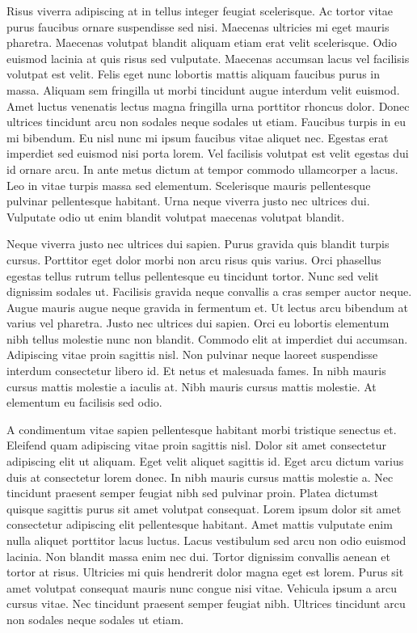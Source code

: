 \documentclass[11pt,a4paper]{article}
\begin{document}
Risus viverra adipiscing at in tellus integer feugiat scelerisque. Ac tortor vitae purus faucibus ornare suspendisse sed nisi. Maecenas ultricies mi eget mauris pharetra. Maecenas volutpat blandit aliquam etiam erat velit scelerisque. Odio euismod lacinia at quis risus sed vulputate. Maecenas accumsan lacus vel facilisis volutpat est velit. Felis eget nunc lobortis mattis aliquam faucibus purus in massa. Aliquam sem fringilla ut morbi tincidunt augue interdum velit euismod. Amet luctus venenatis lectus magna fringilla urna porttitor rhoncus dolor. Donec ultrices tincidunt arcu non sodales neque sodales ut etiam. Faucibus turpis in eu mi bibendum. Eu nisl nunc mi ipsum faucibus vitae aliquet nec. Egestas erat imperdiet sed euismod nisi porta lorem. Vel facilisis volutpat est velit egestas dui id ornare arcu. In ante metus dictum at tempor commodo ullamcorper a lacus. Leo in vitae turpis massa sed elementum. Scelerisque mauris pellentesque pulvinar pellentesque habitant. Urna neque viverra justo nec ultrices dui. Vulputate odio ut enim blandit volutpat maecenas volutpat blandit.

Neque viverra justo nec ultrices dui sapien. Purus gravida quis blandit turpis cursus. Porttitor eget dolor morbi non arcu risus quis varius. Orci phasellus egestas tellus rutrum tellus pellentesque eu tincidunt tortor. Nunc sed velit dignissim sodales ut. Facilisis gravida neque convallis a cras semper auctor neque. Augue mauris augue neque gravida in fermentum et. Ut lectus arcu bibendum at varius vel pharetra. Justo nec ultrices dui sapien. Orci eu lobortis elementum nibh tellus molestie nunc non blandit. Commodo elit at imperdiet dui accumsan. Adipiscing vitae proin sagittis nisl. Non pulvinar neque laoreet suspendisse interdum consectetur libero id. Et netus et malesuada fames. In nibh mauris cursus mattis molestie a iaculis at. Nibh mauris cursus mattis molestie. At elementum eu facilisis sed odio.

A condimentum vitae sapien pellentesque habitant morbi tristique senectus et. Eleifend quam adipiscing vitae proin sagittis nisl. Dolor sit amet consectetur adipiscing elit ut aliquam. Eget velit aliquet sagittis id. Eget arcu dictum varius duis at consectetur lorem donec. In nibh mauris cursus mattis molestie a. Nec tincidunt praesent semper feugiat nibh sed pulvinar proin. Platea dictumst quisque sagittis purus sit amet volutpat consequat. Lorem ipsum dolor sit amet consectetur adipiscing elit pellentesque habitant. Amet mattis vulputate enim nulla aliquet porttitor lacus luctus. Lacus vestibulum sed arcu non odio euismod lacinia. Non blandit massa enim nec dui. Tortor dignissim convallis aenean et tortor at risus. Ultricies mi quis hendrerit dolor magna eget est lorem. Purus sit amet volutpat consequat mauris nunc congue nisi vitae. Vehicula ipsum a arcu cursus vitae. Nec tincidunt praesent semper feugiat nibh. Ultrices tincidunt arcu non sodales neque sodales ut etiam.
\end{document}
